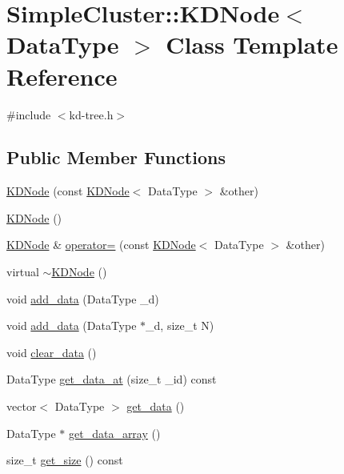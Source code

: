 \hypertarget{classSimpleCluster_1_1KDNode}{\section{Simple\-Cluster\-:\-:K\-D\-Node$<$ Data\-Type $>$ Class Template Reference}
\label{classSimpleCluster_1_1KDNode}
}


{\ttfamily \#include $<$kd-\/tree.\-h$>$}

\subsection*{Public Member Functions}
\begin{DoxyCompactItemize}
\item 
\hyperlink{classSimpleCluster_1_1KDNode_a1722141bf4dab3bb456e0a119c61f4eb}{K\-D\-Node} (const \hyperlink{classSimpleCluster_1_1KDNode}{K\-D\-Node}$<$ Data\-Type $>$ \&other)
\item 
\hyperlink{classSimpleCluster_1_1KDNode_acd1e07a0d8bd2d5b9631c4d42cee7e72}{K\-D\-Node} ()
\item 
\hyperlink{classSimpleCluster_1_1KDNode}{K\-D\-Node} \& \hyperlink{classSimpleCluster_1_1KDNode_a7719d6922448ee1c3c4f777117ce48a0}{operator=} (const \hyperlink{classSimpleCluster_1_1KDNode}{K\-D\-Node}$<$ Data\-Type $>$ \&other)
\item 
virtual \hyperlink{classSimpleCluster_1_1KDNode_a997a7e9b6cb385f9a8978a081244f34b}{$\sim$\-K\-D\-Node} ()
\item 
void \hyperlink{classSimpleCluster_1_1KDNode_ab5ab826e385427c782eca75bb579df31}{add\-\_\-data} (Data\-Type \-\_\-d)
\item 
void \hyperlink{classSimpleCluster_1_1KDNode_a45ea5b8bc60f3fda9675ec4d5df359e7}{add\-\_\-data} (Data\-Type $\ast$\-\_\-d, size\-\_\-t N)
\item 
void \hyperlink{classSimpleCluster_1_1KDNode_af8cb50f3b2e976537667ed84984b4a84}{clear\-\_\-data} ()
\item 
Data\-Type \hyperlink{classSimpleCluster_1_1KDNode_ac18f6502b432eb3dbb4c3e044a337eb4}{get\-\_\-data\-\_\-at} (size\-\_\-t \-\_\-id) const 
\item 
vector$<$ Data\-Type $>$ \hyperlink{classSimpleCluster_1_1KDNode_a4843000adf8b61cf76d1b8d5b2482e4f}{get\-\_\-data} ()
\item 
Data\-Type $\ast$ \hyperlink{classSimpleCluster_1_1KDNode_a4cd53403250eba4e5cf0ff159eb58c52}{get\-\_\-data\-\_\-array} ()
\item 
size\-\_\-t \hyperlink{classSimpleCluster_1_1KDNode_ab06c42728e2c9eaaae39efcf7a70b736}{get\-\_\-size} () const 
\end{DoxyCompactItemize}
